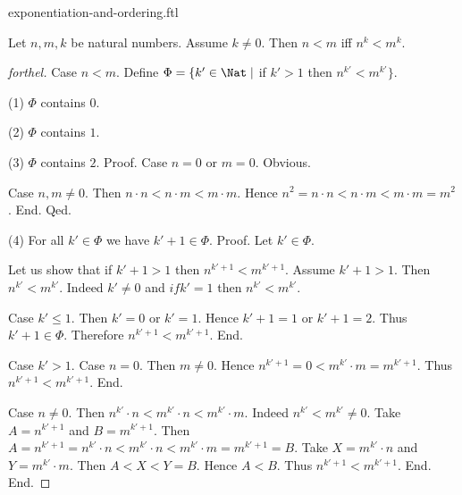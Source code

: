 \documentclass{naproche-library}
\begin{document}
\begin{smodule}[title=Exponentiation and Ordering]{exponentiation-and-ordering.ftl}

\begin{proposition}[forthel,id=ARITHMETIC_09_3373702288769024]
  Let $n, m, k$ be natural numbers.
  Assume $k \neq 0$.
  Then $n < m$ iff $n^{k} < m^{k}$.
\end{proposition}
\begin{proof}[forthel]
  Case $n < m$.
    Define $\Phi = \{ k' \in \Nat \mid$ if $k' > 1$ then $n^{k'} < m^{k'} \}$.

    (1) $\Phi$ contains $0$.

    (2) $\Phi$ contains $1$.

    (3) $\Phi$ contains $2$. \newline
    Proof.
      Case $n = 0$ or $m = 0$. Obvious.

      Case $n, m \neq 0$.
        Then $n \cdot n
          < n \cdot m
          < m \cdot m$.
        Hence $n^{2}
          = n \cdot n
          < n \cdot m
          < m \cdot m
          = m^{2}$.
      End.
    Qed.

    (4) For all $k' \in \Phi$ we have $k' + 1 \in \Phi$. \newline
    Proof.
      Let $k' \in \Phi$.

      Let us show that if $k' + 1 > 1$ then $n^{k' + 1} < m^{k' + 1}$.
        Assume $k' + 1 > 1$.
        Then $n^{k'} < m^{k'}$.
        Indeed $k' \neq 0$ and $if k' = 1$ then $n^{k'} < m^{k'}$.

        Case $k' \leq 1$.
          Then $k' = 0$ or $k' = 1$.
          Hence $k' + 1 = 1$ or $k' + 1 = 2$.
          Thus $k' + 1 \in \Phi$.
          Therefore $n^{k' + 1} < m^{k' + 1}$.
        End.

        Case $k' > 1$.
          Case $n = 0$.
            Then $m \neq 0$.
            Hence $n^{k' + 1}
              = 0
              < m^{k'} \cdot m
              = m^{k' + 1}$.
            Thus $n^{k' + 1} < m^{k' + 1}$.
          End.

          Case $n \neq 0$.
            Then $n^{k'} \cdot n
              < m^{k'} \cdot n
              < m^{k'} \cdot m$.
            Indeed $n^{k'} < m^{k'} \neq 0$.
            Take $A = n^{k' + 1}$ and $B = m^{k' + 1}$. %
            Then $A
              = n^{k' + 1}
              = n^{k'} \cdot n
              < m^{k'} \cdot n
              < m^{k'} \cdot m
              = m^{k' + 1}
              = B$.
            Take $X = m^{k'} \cdot n$ and $Y = m^{k'} \cdot m$.
            Then $A < X < Y = B$.
            Hence $A < B$.
            Thus $n^{k' + 1} < m^{k' + 1}$.
          End.
        End.


\end{proof}
\end{smodule}
\end{document}
